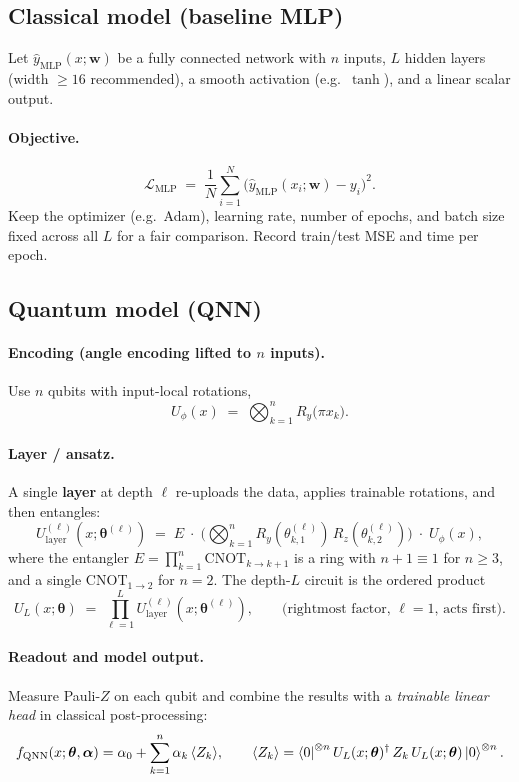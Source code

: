 \documentclass[11pt]{article}
\begin{document}
\subsection*{Classical model (baseline MLP)}
Let $\hat y_{\text{MLP}}(x; \boldsymbol{w})$ be a fully connected network with $n$ inputs, $L$ hidden layers (width $\ge 16$ recommended), a smooth activation (e.g.\ $\tanh$), and a linear scalar output.

\paragraph{Objective.}
\[
\mathcal{L}_{\text{MLP}}
\;=\;
\frac{1}{N}\sum_{i=1}^{N}
\big(\hat y_{\text{MLP}}(x_i;\boldsymbol{w}) - y_i\big)^2.
\]
Keep the optimizer (e.g.\ Adam), learning rate, number of epochs, and batch size fixed across all $L$ for a fair comparison. Record train/test MSE and time per epoch.

\subsection*{Quantum model (QNN)}

\paragraph{Encoding (angle encoding lifted to $n$ inputs).}
Use $n$ qubits with input-local rotations,
\[
U_\phi(x) \;=\; \bigotimes_{k=1}^n R_y\!\big(\pi x_k\big).
\]

\paragraph{Layer / ansatz.}
A single \textbf{layer} at depth $\ell$ re-uploads the data, applies trainable rotations, and then entangles:
\[
U_{\text{layer}}^{(\ell)}(x;\boldsymbol{\theta}^{(\ell)})
\;=\;
E\;\cdot\;
\Big(\bigotimes_{k=1}^n R_y(\theta^{(\ell)}_{k,1})\,R_z(\theta^{(\ell)}_{k,2})\Big)
\;\cdot\;
U_\phi(x),
\]
where the entangler $E=\prod_{k=1}^{n}\mathrm{CNOT}_{k\to k+1}$ is a ring with $n+1\equiv 1$ for $n\ge3$, and a single $\mathrm{CNOT}_{1\to2}$ for $n=2$.
The depth-$L$ circuit is the ordered product
\[
U_L(x;\boldsymbol{\theta}) \;=\; \prod_{\ell=1}^{L} U_{\text{layer}}^{(\ell)}(x;\boldsymbol{\theta}^{(\ell)}),
\qquad\text{(rightmost factor, $\ell=1$, acts first)}.
\]

\paragraph{Readout and model output.}
Measure Pauli-$Z$ on each qubit and combine the results with a \emph{trainable linear head} in classical post-processing:
\[
f_{\mathrm{QNN}}(x;\boldsymbol{\theta},\boldsymbol{\alpha})
=
\alpha_0 + \sum_{k=1}^n \alpha_k\, \langle Z_k\rangle,
\qquad
\langle Z_k\rangle
=\bra{0}^{\otimes n} U_L(x;\boldsymbol{\theta})^\dagger\, Z_k\,U_L(x;\boldsymbol{\theta})\ket{0}^{\otimes n}.
\]
\end{document}
